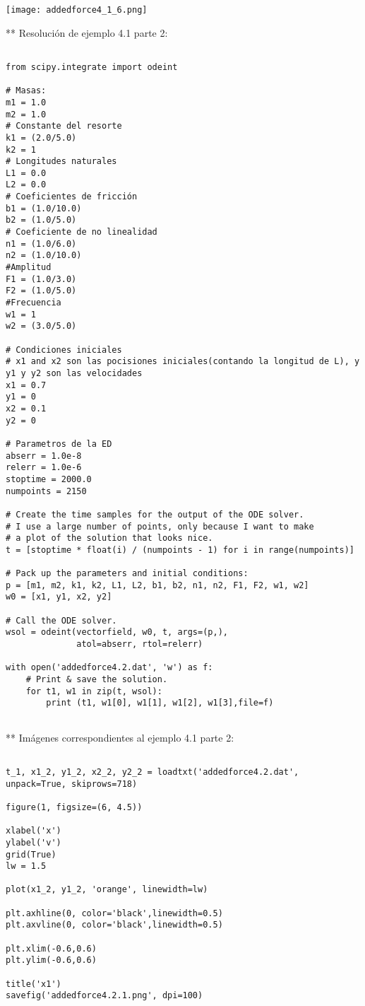 \documentclass{article} %
\begin{document}
\begin{center}
	\texttt{[image: addedforce4\_1\_6.png]}
\end{center}


** Resolución de ejemplo 4.1 parte 2:


\begin{verbatim} 

from scipy.integrate import odeint

# Masas:
m1 = 1.0
m2 = 1.0
# Constante del resorte
k1 = (2.0/5.0)
k2 = 1
# Longitudes naturales
L1 = 0.0
L2 = 0.0
# Coeficientes de fricción
b1 = (1.0/10.0)
b2 = (1.0/5.0)
# Coeficiente de no linealidad
n1 = (1.0/6.0)
n2 = (1.0/10.0)
#Amplitud
F1 = (1.0/3.0)
F2 = (1.0/5.0)
#Frecuencia
w1 = 1
w2 = (3.0/5.0)

# Condiciones iniciales
# x1 and x2 son las pocisiones iniciales(contando la longitud de L), y y1 y y2 son las velocidades
x1 = 0.7
y1 = 0
x2 = 0.1
y2 = 0

# Parametros de la ED
abserr = 1.0e-8
relerr = 1.0e-6
stoptime = 2000.0
numpoints = 2150

# Create the time samples for the output of the ODE solver.
# I use a large number of points, only because I want to make
# a plot of the solution that looks nice.
t = [stoptime * float(i) / (numpoints - 1) for i in range(numpoints)]

# Pack up the parameters and initial conditions:
p = [m1, m2, k1, k2, L1, L2, b1, b2, n1, n2, F1, F2, w1, w2]
w0 = [x1, y1, x2, y2]

# Call the ODE solver.
wsol = odeint(vectorfield, w0, t, args=(p,),
              atol=abserr, rtol=relerr)

with open('addedforce4.2.dat', 'w') as f:
    # Print & save the solution.
    for t1, w1 in zip(t, wsol):
        print (t1, w1[0], w1[1], w1[2], w1[3],file=f)


\end{verbatim}


** Imágenes correspondientes al ejemplo 4.1 parte 2:


\begin{verbatim} 

t_1, x1_2, y1_2, x2_2, y2_2 = loadtxt('addedforce4.2.dat', unpack=True, skiprows=718)

figure(1, figsize=(6, 4.5))

xlabel('x')
ylabel('v')
grid(True)
lw = 1.5

plot(x1_2, y1_2, 'orange', linewidth=lw)

plt.axhline(0, color='black',linewidth=0.5)
plt.axvline(0, color='black',linewidth=0.5)

plt.xlim(-0.6,0.6)
plt.ylim(-0.6,0.6)

title('x1')
savefig('addedforce4.2.1.png', dpi=100)


\end{verbatim}
\end{document}
